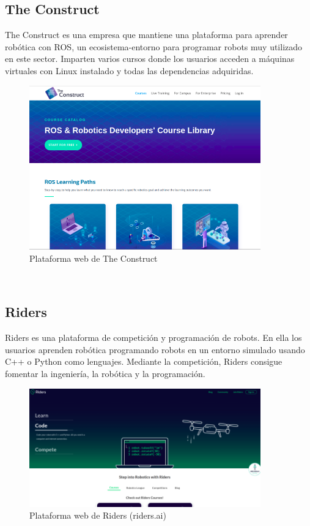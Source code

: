 \cleardoublepage

\subsection{The Construct}
\label{subsec:the_construct}
The Construct es una empresa que mantiene una plataforma para aprender robótica con ROS, un ecosistema-entorno para programar robots muy utilizado en este sector. Imparten varios cursos donde los usuarios acceden a máquinas virtuales con Linux instalado y todas las dependencias adquiridas.\\

\begin{figure}[H]
  \begin{center}
    \includegraphics[width=10cm]{imagenes/cap1/the-construct.png}
  \end{center}
  \caption[Plataforma web de The Construct]{Plataforma web de The Construct\cite{the-construct}}
  \label{fig:the-construct}
\end{figure}\

\subsection{Riders}
\label{subsec:riders}
Riders es una plataforma de competición y programación de robots. En ella los usuarios aprenden robótica programando robots en un entorno simulado usando C++ o Python como lenguajes. Mediante la competición, Riders consigue fomentar la ingeniería, la robótica y la programación.\\

\begin{figure}[H]
  \begin{center}
    \includegraphics[width=10cm]{imagenes/cap1/riders.png}
  \end{center}
  \caption[Plataforma web de Riders (riders.ai)]{Plataforma web de Riders (riders.ai) \cite{riders}}
  \label{fig:riders-ai}
\end{figure}\



